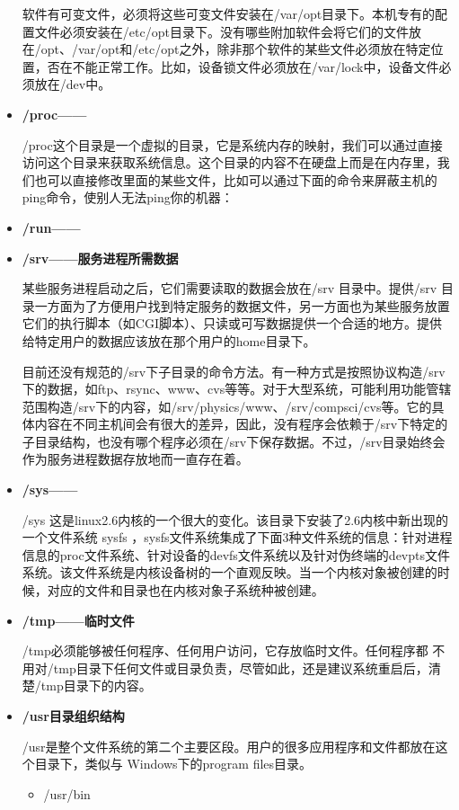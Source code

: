 \begin{itemize}
\qquad 软件有可变文件，必须将这些可变文件安装在/var/opt目录下。本机专有的配置文件必须安装在/etc/opt目录下。没有哪些附加软件会将它们的文件放在/opt、/var/opt和/etc/opt之外，除非那个软件的某些文件必须放在特定位置，否在不能正常工作。比如，设备锁文件必须放在/var/lock中，设备文件必须放在/dev中。

\item \textbf{/proc——}

\qquad /proc这个目录是一个虚拟的目录，它是系统内存的映射，我们可以通过直接访问这个目录来获取系统信息。这个目录的内容不在硬盘上而是在内存里，我们也可以直接修改里面的某些文件，比如可以通过下面的命令来屏蔽主机的ping命令，使别人无法ping你的机器：

\item \textbf{/run——}

\item \textbf{/srv——服务进程所需数据}

\qquad 某些服务进程启动之后，它们需要读取的数据会放在/srv 目录中。提供/srv 目录一方面为了方便用户找到特定服务的数据文件，另一方面也为某些服务放置它们的执行脚本（如CGI脚本）、只读或可写数据提供一个合适的地方。提供给特定用户的数据应该放在那个用户的home目录下。

\qquad 目前还没有规范的/srv下子目录的命令方法。有一种方式是按照协议构造/srv下的数据，如ftp、rsync、www、cvs等等。对于大型系统，可能利用功能管辖范围构造/srv下的内容，如/srv/physics/www、/srv/compsci/cvs等。它的具体内容在不同主机间会有很大的差异，因此，没有程序会依赖于/srv下特定的子目录结构，也没有哪个程序必须在/srv下保存数据。不过，/srv目录始终会作为服务进程数据存放地而一直存在着。

\item \textbf{/sys——}

\qquad /sys 这是linux2.6内核的一个很大的变化。该目录下安装了2.6内核中新出现的一个文件系统 sysfs ，sysfs文件系统集成了下面3种文件系统的信息：针对进程信息的proc文件系统、针对设备的devfs文件系统以及针对伪终端的devpts文件系统。该文件系统是内核设备树的一个直观反映。当一个内核对象被创建的时候，对应的文件和目录也在内核对象子系统种被创建。

\item \textbf{/tmp——临时文件}

\qquad /tmp必须能够被任何程序、任何用户访问，它存放临时文件。任何程序都 不用对/tmp目录下任何文件或目录负责，尽管如此，还是建议系统重启后，清楚/tmp目录下的内容。

\item \textbf{/usr目录组织结构}

\qquad /usr是整个文件系统的第二个主要区段。用户的很多应用程序和文件都放在这个目录下，类似与
Windows下的program files目录。
	\begin{itemize}
	\item /usr/bin
	

\end{itemize}
\end{itemize}
